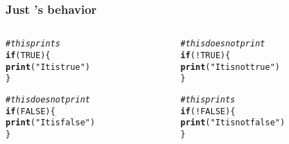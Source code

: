 \documentclass[12pt]{beamer}\usepackage[]{graphicx}\usepackage[]{color}
\makeatletter
\newcommand{\hlnum}[1]{\textcolor[rgb]{0.686,0.059,0.569}{#1}}%
\newcommand{\hlstr}[1]{\textcolor[rgb]{0.192,0.494,0.8}{#1}}%
\newcommand{\hlcom}[1]{\textcolor[rgb]{0.678,0.584,0.686}{\textit{#1}}}%
\newcommand{\hlopt}[1]{\textcolor[rgb]{0,0,0}{#1}}%
\newcommand{\hlstd}[1]{\textcolor[rgb]{0.345,0.345,0.345}{#1}}%
\newcommand{\hlkwa}[1]{\textcolor[rgb]{0.161,0.373,0.58}{\textbf{#1}}}%
\newcommand{\hlkwd}[1]{\textcolor[rgb]{0.737,0.353,0.396}{\textbf{#1}}}%
\newenvironment{kframe}{%
 \def\at@end@of@kframe{}%
 \ifinner\ifhmode%
  \def\at@end@of@kframe{\end{minipage}}%
  \begin{minipage}{\columnwidth}%
 \fi\fi%
 \def\FrameCommand##1{\hskip\@totalleftmargin \hskip-\fboxsep
 \colorbox{shadecolor}{##1}\hskip-\fboxsep
     \hskip-\linewidth \hskip-\@totalleftmargin \hskip\columnwidth}%
 \MakeFramed {\advance\hsize-\width
   \@totalleftmargin\z@ \linewidth\hsize
   \@setminipage}}%
 {\par\unskip\endMakeFramed%
 \at@end@of@kframe}
\newenvironment{knitrout}{}{} %
\makeatother
\begin{document}
\begin{frame}[fragile]
\frametitle{Just 's behavior}

\begin{columns}[t]
\begin{column}{0.45\textwidth}
\begin{knitrout}\footnotesize
{}\color{fgcolor}\begin{kframe}
\begin{alltt}
\hlcom{# this prints}
\hlkwa{if} \hlstd{(}\hlnum{TRUE}\hlstd{) \{}
  \hlkwd{print}\hlstd{(}\hlstr{"It is true"}\hlstd{)}
\hlstd{\}}


\hlcom{# this does not print}
\hlkwa{if} \hlstd{(}\hlnum{FALSE}\hlstd{) \{}
  \hlkwd{print}\hlstd{(}\hlstr{"It is false"}\hlstd{)}
\hlstd{\}}
\end{alltt}
\end{kframe}
\end{knitrout}
\end{column}

\begin{column}{0.45\textwidth}
\begin{knitrout}\footnotesize
{}\color{fgcolor}\begin{kframe}
\begin{alltt}
\hlcom{# this does not print}
\hlkwa{if} \hlstd{(}\hlopt{!}\hlnum{TRUE}\hlstd{) \{}
  \hlkwd{print}\hlstd{(}\hlstr{"It is not true"}\hlstd{)}
\hlstd{\}}


\hlcom{# this prints}
\hlkwa{if} \hlstd{(}\hlopt{!}\hlnum{FALSE}\hlstd{) \{}
  \hlkwd{print}\hlstd{(}\hlstr{"It is not false"}\hlstd{)}
\hlstd{\}}
\end{alltt}
\end{kframe}
\end{knitrout}
\end{column}
\end{columns}

\end{frame}

\end{document}
